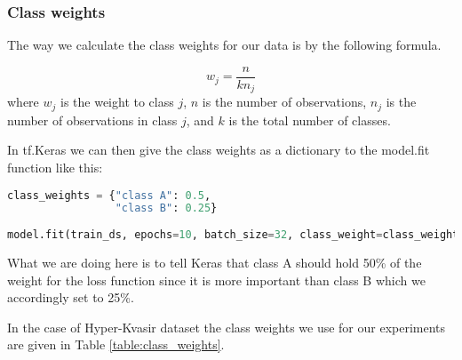 \documentclass[thesis.tex]{subfiles}
\begin{document}
\subsubsection{Class weights}
The way we calculate the class weights for our data is by the following formula.

\[
w_j = \frac{n}{kn_j}
\]
where $w_j$ is the weight to class $j$, $n$ is the number of observations, $n_j$ is the number of observations in class $j$, and $k$ is the total number of classes.

In tf.Keras we can then give the class weights as a dictionary to the model.fit function like this:

\begin{lstlisting}[language=Python]
class_weights = {"class A": 0.5,
				 "class B": 0.25}
				 
model.fit(train_ds, epochs=10, batch_size=32, class_weight=class_weight)
\end{lstlisting}

What we are doing here is to tell Keras that class A should hold 50\% of the weight for the loss function since it is more important than class B which we accordingly set to 25\%.

In the case of Hyper-Kvasir dataset the class weights we use for our experiments are given in Table \ref{table:class_weights}.
\end{document}
